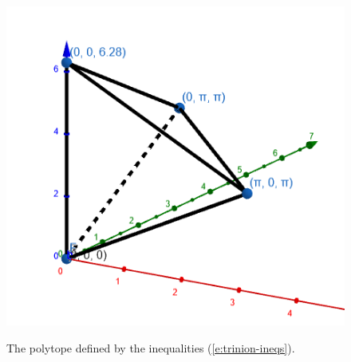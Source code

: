 	\begin{figure}[h]
	\centering
	\includegraphics[width=0.5\linewidth]{polytope.png}\label{fig:polytope}
	\caption{The polytope defined by the inequalities (\ref{e:trinion-ineqs}).}
	\end{figure}

